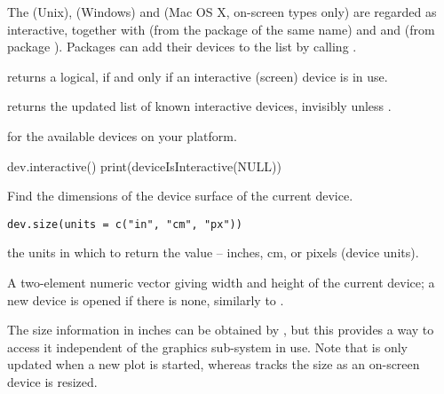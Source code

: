 %
\begin{Details}\relax
The  (Unix),  (Windows) and 
(Mac OS X, on-screen types only) are regarded as interactive, together
with  (from the package of the same name) and
 and  (from package ).
Packages can add their devices to the list by calling
.
\end{Details}
%
\begin{Value}
 returns a logical,  if and only if an
interactive (screen) device is in use.

 returns the updated list of known
interactive devices, invisibly unless .
\end{Value}
%
\begin{SeeAlso}\relax
{} for the available devices on your platform.
\end{SeeAlso}
%
\begin{Examples}
\begin{ExampleCode}
dev.interactive()
print(deviceIsInteractive(NULL))
\end{ExampleCode}
\end{Examples}
%
\begin{Description}\relax
Find the dimensions of the device surface of the current device.
\end{Description}
%
\begin{Usage}
\begin{verbatim}
dev.size(units = c("in", "cm", "px"))
\end{verbatim}
\end{Usage}
%
\begin{Arguments}
\begin{ldescription}
\item[\code{units}] the units in which to return the value -- inches, cm, or
pixels (device units).
\end{ldescription}
\end{Arguments}
%
\begin{Value}
A two-element numeric vector giving width and height of the current
device; a new device is opened if there is none, similarly to
.
\end{Value}
%
\begin{SeeAlso}\relax
The size information in inches can be obtained by
, but this provides a way to access it
independent of the graphics sub-system in use.  Note that
 is only updated when a new plot is started, whereas
 tracks the size as an on-screen device is resized. 
\end{SeeAlso}
